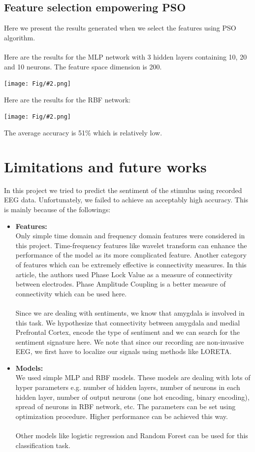 \documentclass[]{article}
\newcommand{\pict}[2]{\begin{center}
		\texttt{[image: Fig/\#2.png]}
\end{center}}
\begin{document}
	\subsection{Feature selection empowering PSO}
	Here we present the results generated when we select the features using PSO algorithm.\\\\
	Here are the results for the MLP network with 3 hidden layers containing 10, 20 and 10 neurons. The feature space dimension is 200.
	\pict{0.6}{F11}
	Here are the results for the RBF network:
	\pict{0.6}{F10}
	The average accuracy is 51\% which is relatively low.
	
	\section{Limitations and future works}
	In this project we tried to predict the sentiment of the stimulus using recorded EEG data. Unfortunately, we failed to achieve an acceptably high accuracy. This is mainly because of the followings:
	\begin{itemize}
		\item \textbf{Features:}\\
		Only simple time domain and frequency domain features were considered in this project. Time-frequency features like wavelet transform can enhance the performance of the model as its more complicated feature. Another category of features which can be extremely effective is connectivity measures. In this article, the authors used Phase Lock Value as a measure of connectivity between electrodes. Phase Amplitude Coupling is a better measure of connectivity which can be used here.\\\\
		Since we are dealing with sentiments, we know that amygdala is involved in this task. We hypothesize that connectivity between amygdala and medial Prefrontal Cortex, encode the type of sentiment and we can search for the sentiment signature here. We note that since our recording are non-invasive EEG, we first have to localize our signals using methods like LORETA.
		
		\item \textbf{Models:}\\
		We used simple MLP and RBF models. These models are dealing with lots of hyper parameters e.g. number of hidden layers, number of neurons in each hidden layer, number of output neurons (one hot encoding, binary encoding), spread of neurons in RBF network, etc. The parameters can be set using optimization procedure. Higher performance can be achieved this way.\\\\
		Other models like logistic regression and Random Forest can be used for this classification task.
	\end{itemize}
	
\end{document}
